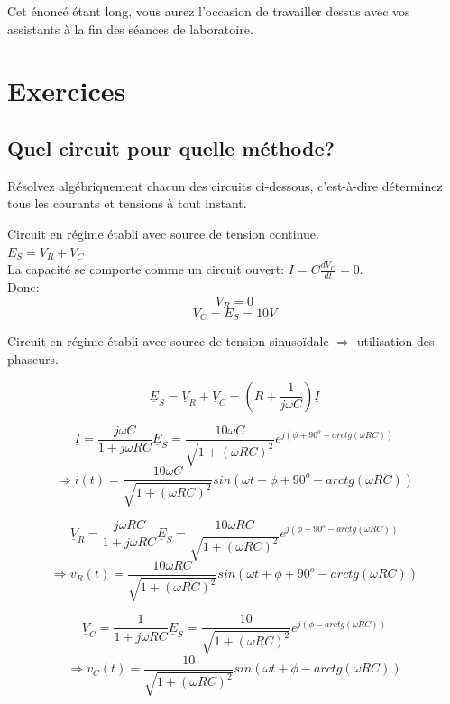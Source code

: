 Cet énoncé étant long, vous aurez l'occasion de travailler dessus avec vos assistants à la fin des séances de laboratoire.
\vspace{5pt}

\newpage

\section{Exercices}
\subsection{Quel circuit pour quelle méthode?}
Résolvez algébriquement chacun des circuits ci-dessous, c'est-à-dire déterminez tous les courants et tensions à tout instant.


{
Circuit en régime établi avec source de tension continue.\\
$E_S=V_R+V_C$\\
La capacité se comporte comme un circuit ouvert: $I=C\frac{dV_C}{dt}=0$.\\
Donc:
$$V_R=0$$ $$V_C=E_S=10V$$	
}

{
Circuit en régime établi avec source de tension sinusoïdale $\Rightarrow$ utilisation des phaseurs.

$$\underline{E}_S=\underline{V}_R+\underline{V}_C=(R+\frac{1}{j\omega C})\underline{I}$$

$$\underline{I}=\frac{j\omega C}{1+j\omega RC}\underline{E}_S=\frac{10\omega C}{\sqrt{1+(\omega RC)^2}}e^{j(\phi+90^o-arctg(\omega RC))}$$
$$\Rightarrow i(t)=\frac{10\omega C}{\sqrt{1+(\omega RC)^2}}sin(\omega t+\phi+90^o-arctg(\omega RC)) $$

$$\underline{V}_R=\frac{j\omega RC}{1+j\omega RC}\underline{E}_S=\frac{10\omega RC}{\sqrt{1+(\omega RC)^2}}e^{j(\phi+90^o-arctg(\omega RC))}$$
$$\Rightarrow v_R(t)=\frac{10\omega RC}{\sqrt{1+(\omega RC)^2}}sin(\omega t+\phi+90^o-arctg(\omega RC))$$

$$\underline{V}_C=\frac{1}{1+j\omega RC}\underline{E}_S=\frac{10}{\sqrt{1+(\omega RC)^2}}e^{j(\phi-arctg(\omega RC))}$$
$$\Rightarrow v_C(t)=\frac{10}{\sqrt{1+(\omega RC)^2}}sin(\omega t+\phi-arctg(\omega RC))$$

}



